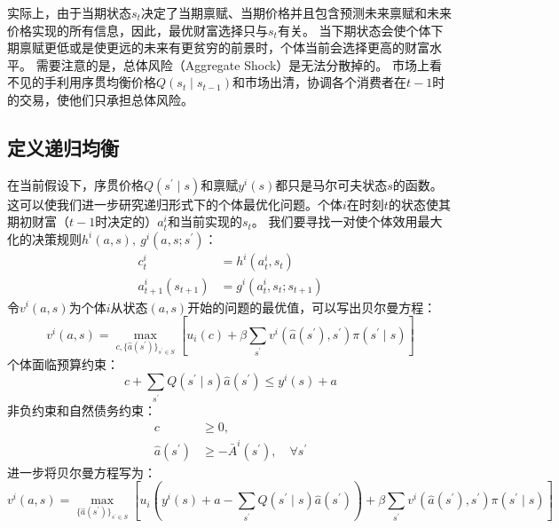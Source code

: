 实际上，由于当期状态$s_t$决定了当期禀赋、当期价格并且包含预测未来禀赋和未来价格实现的所有信息，因此，最优财富选择只与$s_t$有关。
当下期状态会使个体下期禀赋更低或是使更远的未来有更贫穷的前景时，个体当前会选择更高的财富水平。
需要注意的是，总体风险（Aggregate Shock）是无法分散掉的。
市场上看不见的手利用序贯均衡价格$Q\left(s_t\mid s_{t-1}\right)$和市场出清，协调各个消费者在$t-1$时的交易，使他们只承担总体风险。


\subsection{定义递归均衡}

在当前假设下，序贯价格$Q\left(s^{\prime}\mid s\right)$和禀赋$y^i\left(s\right)$都只是马尔可夫状态$s$的函数。
这可以使我们进一步研究递归形式下的个体最优化问题。个体$i$在时刻$t$的状态使其期初财富（$t-1$时决定的）$a_t^i$和当前实现的$s_t$。
我们要寻找一对使个体效用最大化的决策规则$h^i\left(a,s\right),~ g^i\left(a,s;s^{\prime}\right)$：
\begin{subequations}
    \begin{align}
        c_t^i & =h^i\left(a_t^i, s_t\right) \\
        a_{t+1}^i\left(s_{t+1}\right) & =g^i\left(a_t^i, s_t;s_{t+1}\right)
    \end{align}
\end{subequations}
令$v^i\left(a,s\right)$为个体$i$从状态$\left(a,s\right)$开始的问题的最优值，可以写出贝尔曼方程：
\begin{equation}    \label{eq-rce-bellman}
    v^i(a, s)=\max_{c, \{\hat{a}\left(s^{\prime}\right)\}_{s^\prime\in S}}
        \left[u_i(c)+
        \beta\sum_{s^{\prime}}v^i\left(\hat{a}\left(s^{\prime}\right), s^{\prime}\right) \pi\left(s^{\prime}\mid s\right)\right]
\end{equation}
个体面临预算约束：
\begin{equation}    \label{eq-rce-bc}
    c+\sum_{s^{\prime}} Q\left(s^{\prime}\mid s\right) \hat{a}\left(s^{\prime}\right) \leq y^i(s)+a
\end{equation}
非负约束和自然债务约束：
\begin{subequations}
    \begin{align}
        c & \geq 0, \\
        \hat{a}\left(s^{\prime}\right) & \geq -\bar{A}^i\left(s^{\prime}\right), \quad \forall s^{\prime}
    \end{align}
\end{subequations}
进一步将贝尔曼方程写为：
\begin{equation*}
    v^i(a, s) = \max_{\{\hat{a}\left(s^{\prime}\right)\}_{s^\prime\in S}}
        \left[u_i\left(y^i\left(s\right)+a-\sum_{s^{\prime}}Q\left(s^{\prime}\mid s\right)\hat{a}\left(s^{\prime}\right)\right)+      
        \beta\sum_{s^{\prime}}v^i\left(\hat{a}\left(s^{\prime}\right), s^{\prime}\right) \pi\left(s^{\prime}\mid s\right)\right]
\end{equation*}
